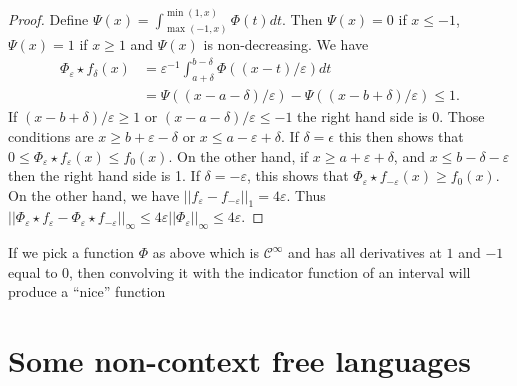 \documentclass{article}
\begin{document}
\begin{proof}
  Define $\Psi(x) = \int_{\max(-1, x)}^{\min(1,x)} \Phi(t) dt$. Then
  $\Psi(x) = 0$ if $x \le -1$, $\Psi(x) = 1$ if $x \ge 1$ and $\Psi(x)$
  is non-decreasing.
  We have
  \begin{displaymath}
    \begin{aligned}
      \Phi_\varepsilon \star f_\delta(x) & = \varepsilon^{-1}\int_{a +
      \delta}^{b - \delta}
      \Phi((x - t)/\varepsilon) dt \\
      & = \Psi((x-a - \delta)/\varepsilon) -
      \Psi((x-b+\delta)/\varepsilon) \le 1.
    \end{aligned}
  \end{displaymath}
If $(x-b + \delta)/\varepsilon \ge 1$ or $(x-a-\delta)/\varepsilon \le
-1$ the right hand side is 0. Those conditions are $x \ge b + \varepsilon
- \delta$ or $x \le a - \varepsilon + \delta$. If $\delta = \epsilon$
this then shows that $0 \le \Phi_\varepsilon \star f_\varepsilon(x) \le f_0(x)$.
On the other hand, if $x \ge a + \varepsilon + \delta$, and $x \le b -
\delta - \varepsilon$ then the right hand side is 1.
If $\delta = - \varepsilon$, this shows that $\Phi_\varepsilon \star
f_{-\varepsilon}(x) \ge f_0(x)$.
On the other hand, we have $||f_\varepsilon - f_{-\varepsilon}||_1 = 4
\varepsilon$. Thus $||\Phi_\varepsilon \star f_\varepsilon - 
\Phi_\varepsilon \star f_{-\varepsilon}||_\infty \le 4 \varepsilon
||\Phi_\varepsilon||_\infty \le 4 \varepsilon$.
\end{proof}
If we pick a function $\Phi$ as above which is $\mathcal{C}^\infty$
and has all derivatives at $1$ and $-1$ equal to 0, then convolving it
with the indicator function of an interval will produce a ``nice''
function 
\appendix

\section{Some non-context free languages}
\label{sec:nonCFL}
\end{document}
